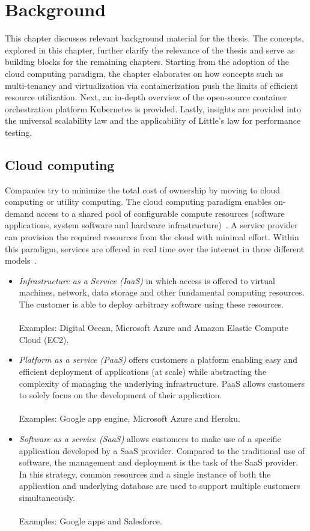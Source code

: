 \chapter{Background}
\label{ch:background}
This chapter discusses relevant background material for the thesis. The concepts, explored in this chapter, further clarify the relevance of the thesis and serve as building blocks for the remaining chapters. Starting from the adoption of the cloud computing paradigm, the chapter elaborates on how concepts such as multi-tenancy and virtualization via containerization push the limits of efficient resource utilization. Next, an in-depth overview of the open-source container orchestration platform Kubernetes is provided. Lastly, insights are provided into the universal scalability law and the applicability of Little's law for performance testing.
\section{Cloud computing}
Companies try to minimize the total cost of ownership by moving to cloud computing or utility computing. The cloud computing paradigm enables on-demand access to a shared pool of configurable compute resources (software applications, system software and hardware infrastructure)~\cite{WalravenStefan2015PPmf}. A service provider can provision the required resources from the cloud with minimal effort.  Within this paradigm, services are offered in real time over the internet in three different models~\cite{MellPeter2010TNDo,rimal2009taxonomy}. 
\begin{itemize}
\item \textit{Infrastructure as a Service (IaaS)} in which access is offered to virtual machines, network, data storage and other fundamental computing resources. The customer is able to deploy arbitrary software using these resources.\\\\
Examples: Digital Ocean, Microsoft Azure and Amazon Elastic Compute Cloud (EC2).
\item \textit{Platform as a service (PaaS)} offers customers a platform enabling easy and efficient deployment of applications (at scale) while abstracting the complexity of managing the underlying infrastructure. PaaS allows customers to solely focus on the development of their application.\\\\
Examples: Google app engine, Microsoft Azure and Heroku.
\item \textit{Software as a service (SaaS) } allows customers to make use of a specific application developed by a SaaS provider. Compared to the traditional use of software, the management and deployment is the task of the SaaS provider. In this strategy, common resources and a single instance of both the application and underlying database are used to support multiple customers simultaneously. \\\\
Examples: Google apps and Salesforce.
\end{itemize}

